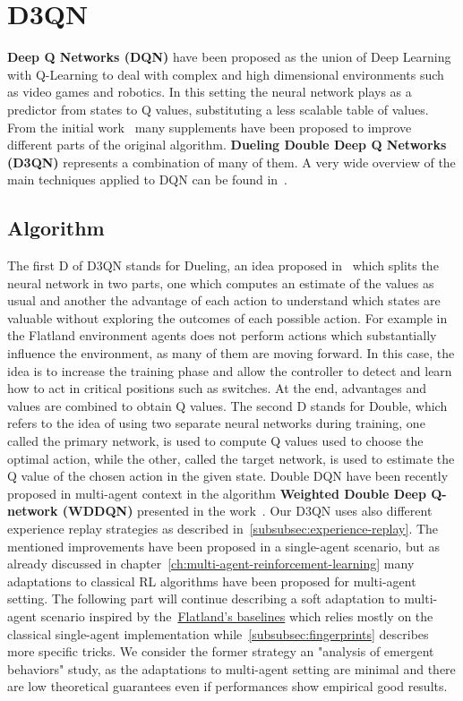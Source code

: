 \documentclass[11pt, a4paper, hidelinks]{report}
\begin{document}
\section{D3QN}\label{sec:d3qn}

\textbf{Deep Q Networks (DQN)} have been proposed as the union of Deep Learning with Q-Learning to deal with complex and high dimensional environments such as video games and robotics.
In this setting the neural network plays as a predictor from states to Q values, substituting a less scalable table of values.
From the initial work~\citep{dqn} many supplements have been proposed to improve different parts of the original algorithm.
\textbf{Dueling Double Deep Q Networks (D3QN)} represents a combination of many of them.
A very wide overview of the main techniques applied to DQN can be found in~\citep{rainbow}.

\subsection{Algorithm}\label{subsec:algorithm2}

The first D of D3QN stands for Dueling, an idea proposed in~\citep{dueling} which splits the neural network in two parts, one which computes an estimate of the values as usual and another the advantage of each action to understand which states are valuable without exploring the outcomes of each possible action.
For example in the Flatland environment agents does not perform actions which substantially influence the environment, as many of them are moving forward.
In this case, the idea is to increase the training phase and allow the controller to detect and learn how to act in critical positions such as switches.
At the end, advantages and values are combined to obtain Q values.
The second D stands for Double, which refers to the idea of using two separate neural networks during training, one called the primary network, is used to compute Q values used to choose the optimal action, while the other, called the target network, is used to estimate the Q value of the chosen action in the given state.
Double DQN have been recently proposed in multi-agent context in the algorithm \textbf{Weighted Double Deep Q-network (WDDQN)} presented in the work~\citep{weighted-ddqn}.
Our D3QN uses also different experience replay strategies as described in~\ref{subsubsec:experience-replay}.
The mentioned improvements have been proposed in a single-agent scenario, but as already discussed in chapter~\ref{ch:multi-agent-reinforcement-learning} many adaptations to classical RL algorithms have been proposed for multi-agent setting.
The following part will continue describing a soft adaptation to multi-agent scenario inspired by the~\href{https://gitlab.aicrowd.com/flatland/flatland-examples}{Flatland's baselines} which relies mostly on the classical single-agent implementation while~\ref{subsubsec:fingerprints} describes more specific tricks.
We consider the former strategy an "analysis of emergent behaviors" study, as the adaptations to multi-agent setting are minimal and there are low theoretical guarantees even if performances show empirical good results.
\end{document}
